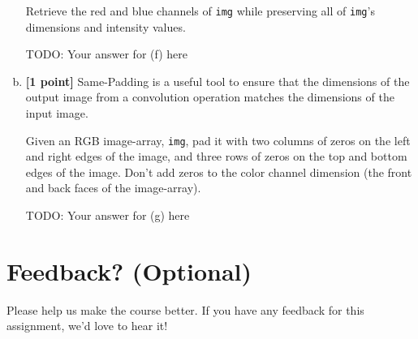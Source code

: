 \begin{enumerate}[(a)]
    \begin{tcolorbox}[colback=orange!5!white,colframe=orange!75!black]
    Retrieve the red and blue channels of \texttt{img} while preserving all of \texttt{img}'s dimensions and intensity values.
    \end{tcolorbox}
    
    \begin{tcolorbox}[colback=white!5!white,colframe=green!75!black]
    \begin{mdframed}
        TODO: Your answer for (f) here
    \end{mdframed}
\end{tcolorbox}
    
    \item \textbf{[1 point]} Same-Padding is a useful tool to ensure that the dimensions of the output image from a convolution operation matches the dimensions of the input image. 
    
    \begin{tcolorbox}[colback=orange!5!white,colframe=orange!75!black]
    Given an RGB image-array, \texttt{img}, pad it with two columns of zeros on the left and right edges of the image, and three rows of zeros on the top and bottom edges of the image. Don't add zeros to the color channel dimension (the front and back faces of the image-array).
    \end{tcolorbox}
    
    \begin{tcolorbox}[colback=white!5!white,colframe=green!75!black]
    \begin{mdframed}
        TODO: Your answer for (g) here
    \end{mdframed}
\end{tcolorbox}
    
\end{enumerate}





\pagebreak
\section*{Feedback? (Optional)}
Please help us make the course better. If you have any feedback for this assignment, we'd love to hear it!


